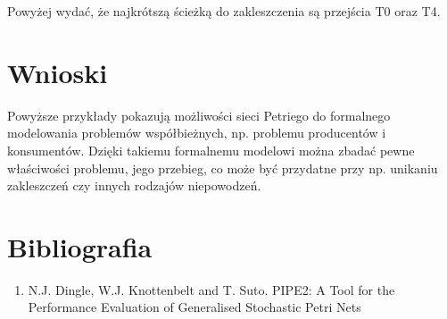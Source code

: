 \documentclass{article}
\begin{document}
Powyżej wydać, że najkrótszą ścieżką do zakleszczenia są przejścia T0 oraz T4.

\section{Wnioski}
Powyższe przykłady pokazują możliwości sieci Petriego do formalnego modelowania problemów
współbieżnych, np. problemu producentów i konsumentów. Dzięki takiemu formalnemu modelowi
można zbadać pewne właściwości problemu, jego przebieg, co może być przydatne przy np.
unikaniu zakleszczeń czy innych rodzajów niepowodzeń.

\section{Bibliografia}

\begin{enumerate}
    \item
    N.J. Dingle, W.J. Knottenbelt and T. Suto. PIPE2: A Tool for the Performance Evaluation of Generalised Stochastic Petri Nets
\end{enumerate}
\end{document}
